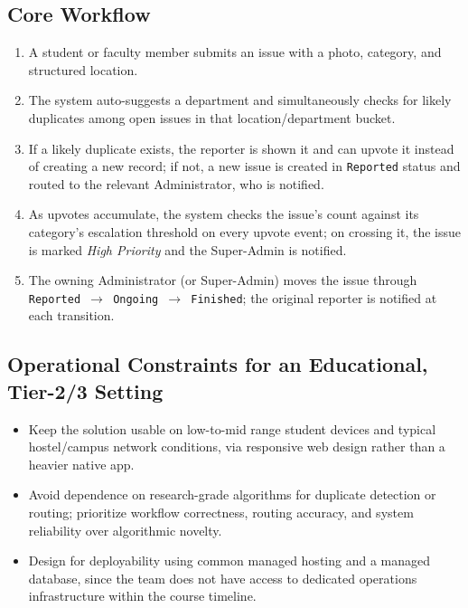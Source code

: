 \documentclass[11pt,a4paper]{article}
\begin{document}
\subsection{Core Workflow}
\begin{enumerate}[leftmargin=0.7cm]
  \item A student or faculty member submits an issue with a photo,
    category, and structured location.
  \item The system auto-suggests a department and simultaneously checks
    for likely duplicates among open issues in that location/department
    bucket.
  \item If a likely duplicate exists, the reporter is shown it and can
    upvote it instead of creating a new record; if not, a new issue is
    created in \texttt{Reported} status and routed to the relevant
    Administrator, who is notified.
  \item As upvotes accumulate, the system checks the issue's count
    against its category's escalation threshold on every upvote event;
    on crossing it, the issue is marked \emph{High Priority} and the
    Super-Admin is notified.
  \item The owning Administrator (or Super-Admin) moves the issue through
    \texttt{Reported $\rightarrow$ Ongoing $\rightarrow$ Finished}; the
    original reporter is notified at each transition.
\end{enumerate}

\subsection{Operational Constraints for an Educational, Tier-2/3 Setting}
\begin{itemize}[leftmargin=0.7cm]
  \item Keep the solution usable on low-to-mid range student devices and
    typical hostel/campus network conditions, via responsive web design
    rather than a heavier native app.
  \item Avoid dependence on research-grade algorithms for duplicate
    detection or routing; prioritize workflow correctness, routing
    accuracy, and system reliability over algorithmic novelty.
  \item Design for deployability using common managed hosting and a
    managed database, since the team does not have access to dedicated
    operations infrastructure within the course timeline.
\end{itemize}
\end{document}
